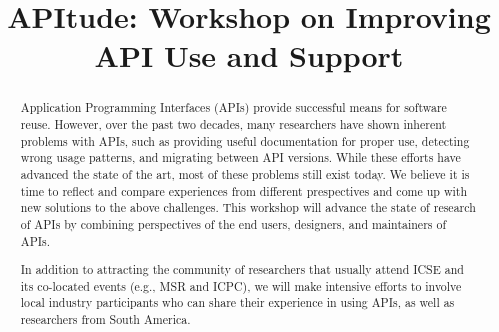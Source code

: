 \documentclass[10pt, conference]{IEEEtran}
\begin{document}
\title{APItude: Workshop on Improving API Use and Support}


\newcommand\tud[0]{\textsuperscript{\normalfont \textdagger}}
\newcommand\iowa[0]{\textsuperscript{\normalfont \textparagraph}}
\newcommand\utd[0]{\textsuperscript{\normalfont \ddag}}
\newcommand\lanu[0]{\textsuperscript{\normalfont \textsection}}
\newcommand\ualberta[0]{\textsuperscript{\normalfont \textasteriskcentered}}

\author{
\and
{}
\and
{}
\and
{}
}


\maketitle


\begin{abstract}
Application Programming Interfaces (APIs) provide successful means for software reuse. However, over the past two decades, many researchers have shown inherent problems with APIs, such as providing useful documentation for proper use, detecting wrong usage patterns, and migrating between API versions. While these efforts have advanced the state of the art, most of these problems still exist today. We believe it is time to reflect and compare experiences from different prespectives and come up with new solutions to the above challenges. This workshop will advance the state of research of APIs by combining perspectives of the end users, designers, and maintainers of APIs.

In addition to attracting the community of researchers that usually attend ICSE and its co-located events (e.g., MSR and ICPC), we will make intensive efforts to involve local industry participants who can share their experience in using APIs, as well as researchers from South America.
\end{abstract}
\end{document}
